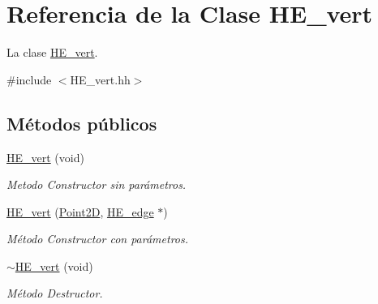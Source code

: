 \hypertarget{class_h_e__vert}{\section{Referencia de la Clase H\-E\-\_\-vert}
\label{class_h_e__vert}
}


La clase \hyperlink{class_h_e__vert}{H\-E\-\_\-vert}.  




{\ttfamily \#include $<$H\-E\-\_\-vert.\-hh$>$}

\subsection*{Métodos públicos}
\begin{DoxyCompactItemize}
\item 
\hypertarget{class_h_e__vert_a9e7ac7b249c9e4adbd61d9faf674ee1c}{\hyperlink{class_h_e__vert_a9e7ac7b249c9e4adbd61d9faf674ee1c}{H\-E\-\_\-vert} (void)}\label{class_h_e__vert_a9e7ac7b249c9e4adbd61d9faf674ee1c}

\begin{DoxyCompactList}\small\item\em Metodo Constructor sin parámetros. \end{DoxyCompactList}\item 
\hyperlink{class_h_e__vert_afe5995e97c6b556388b0d81000ca4224}{H\-E\-\_\-vert} (\hyperlink{class_point2_d}{Point2\-D}, \hyperlink{class_h_e__edge}{H\-E\-\_\-edge} $\ast$)
\begin{DoxyCompactList}\small\item\em Método Constructor con parámetros. \end{DoxyCompactList}\item 
\hypertarget{class_h_e__vert_a1db104715142137649876fb1f3d54238}{\hyperlink{class_h_e__vert_a1db104715142137649876fb1f3d54238}{$\sim$\-H\-E\-\_\-vert} (void)}\label{class_h_e__vert_a1db104715142137649876fb1f3d54238}

\begin{DoxyCompactList}\small\item\em Método Destructor. \end{DoxyCompactList}\end{DoxyCompactItemize}

